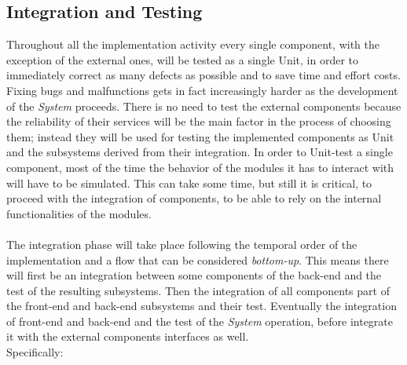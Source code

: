 \documentclass{article}
\begin{document}
	\subsection{Integration and Testing}
	Throughout all the implementation activity every single component, with the exception of the external ones, will be tested as a single Unit, in order to immediately correct as many defects as possible and to save time and effort costs. Fixing bugs and malfunctions gets in fact increasingly harder as the development of the {\it System} proceeds. There is no need to test the external components because the reliability of their services will be the main factor in the process of choosing them; instead they will be used for testing the implemented components as Unit and the subsystems derived from their integration. 
In order to Unit-test a single component, most of the time the behavior of the modules it has to interact with will have to be simulated. This can take some time, but still it is critical, to proceed with the integration of components, to be able to rely on the internal functionalities of the modules. \\ \\
The integration phase will take place following the temporal order of the implementation and a flow that can be considered {\it bottom-up}. This means there will first be an integration between some components of the back-end and the test of the resulting subsystems. Then the integration of all components part of the front-end and back-end subsystems and their test. Eventually the integration of front-end and back-end and the test of the {\it System} operation, before integrate it with the external components interfaces as well. \\
Specifically: \\
\end{document}
